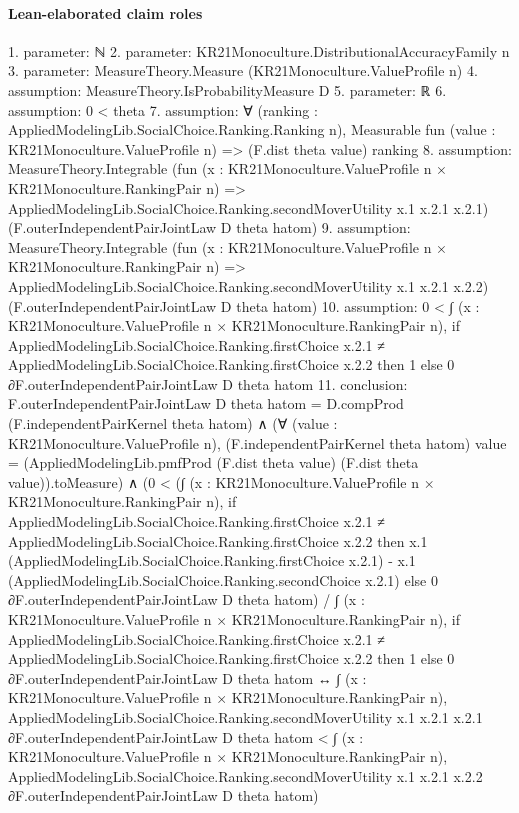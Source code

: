 \documentclass[10pt]{article}
\begin{document}
\paragraph{Lean-elaborated claim roles}\begin{ReviewVerbatim}
1. parameter: ℕ
2. parameter: KR21Monoculture.DistributionalAccuracyFamily n
3. parameter: MeasureTheory.Measure (KR21Monoculture.ValueProfile n)
4. assumption: MeasureTheory.IsProbabilityMeasure D
5. parameter: ℝ
6. assumption: 0 < theta
7. assumption: ∀ (ranking : AppliedModelingLib.SocialChoice.Ranking.Ranking n),
  Measurable fun (value : KR21Monoculture.ValueProfile n) => (F.dist theta value) ranking
8. assumption: MeasureTheory.Integrable
  (fun (x : KR21Monoculture.ValueProfile n × KR21Monoculture.RankingPair n) =>
    AppliedModelingLib.SocialChoice.Ranking.secondMoverUtility x.1 x.2.1 x.2.1)
  (F.outerIndependentPairJointLaw D theta hatom)
9. assumption: MeasureTheory.Integrable
  (fun (x : KR21Monoculture.ValueProfile n × KR21Monoculture.RankingPair n) =>
    AppliedModelingLib.SocialChoice.Ranking.secondMoverUtility x.1 x.2.1 x.2.2)
  (F.outerIndependentPairJointLaw D theta hatom)
10. assumption: 0 <
  ∫ (x : KR21Monoculture.ValueProfile n × KR21Monoculture.RankingPair n),
    if
        AppliedModelingLib.SocialChoice.Ranking.firstChoice x.2.1 ≠
          AppliedModelingLib.SocialChoice.Ranking.firstChoice x.2.2 then
      1
    else 0 ∂F.outerIndependentPairJointLaw D theta hatom
11. conclusion: F.outerIndependentPairJointLaw D theta hatom = D.compProd (F.independentPairKernel theta hatom) ∧
  (∀ (value : KR21Monoculture.ValueProfile n),
      (F.independentPairKernel theta hatom) value =
        (AppliedModelingLib.pmfProd (F.dist theta value) (F.dist theta value)).toMeasure) ∧
    (0 <
        (∫ (x : KR21Monoculture.ValueProfile n × KR21Monoculture.RankingPair n),
            if
                AppliedModelingLib.SocialChoice.Ranking.firstChoice x.2.1 ≠
                  AppliedModelingLib.SocialChoice.Ranking.firstChoice x.2.2 then
              x.1 (AppliedModelingLib.SocialChoice.Ranking.firstChoice x.2.1) -
                x.1 (AppliedModelingLib.SocialChoice.Ranking.secondChoice x.2.1)
            else 0 ∂F.outerIndependentPairJointLaw D theta hatom) /
          ∫ (x : KR21Monoculture.ValueProfile n × KR21Monoculture.RankingPair n),
            if
                AppliedModelingLib.SocialChoice.Ranking.firstChoice x.2.1 ≠
                  AppliedModelingLib.SocialChoice.Ranking.firstChoice x.2.2 then
              1
            else 0 ∂F.outerIndependentPairJointLaw D theta hatom ↔
      ∫ (x : KR21Monoculture.ValueProfile n × KR21Monoculture.RankingPair n),
          AppliedModelingLib.SocialChoice.Ranking.secondMoverUtility x.1 x.2.1
            x.2.1 ∂F.outerIndependentPairJointLaw D theta hatom <
        ∫ (x : KR21Monoculture.ValueProfile n × KR21Monoculture.RankingPair n),
          AppliedModelingLib.SocialChoice.Ranking.secondMoverUtility x.1 x.2.1
            x.2.2 ∂F.outerIndependentPairJointLaw D theta hatom)
\end{ReviewVerbatim}
\end{document}
